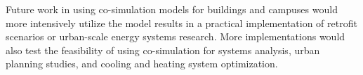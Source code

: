 \documentclass{tBPS2e}
\theoremstyle{plain}
\theoremstyle{definition}
\theoremstyle{remark}
\begin{document}
Future work in using co-simulation models for buildings and campuses would
more intensively utilize the model results in a practical implementation of
retrofit scenarios or urban-scale energy systems research. More implementations would 
also test the feasibility of using co-simulation for systems analysis, urban planning studies, and
cooling and heating system optimization.




\end{document}
